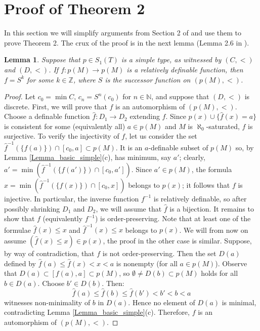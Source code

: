 \documentclass[12pt]{amsart}
\newtheorem{Lemma}[Theorem]{Lemma}
\theoremstyle{definition}
\begin{document}
 


\section{Proof of Theorem 2}


In this section we will simplify arguments from Section 2 of \cite{DI} and use them to prove Theorem 2. The crux of the proof is in the next lemma (Lemma 2.6 in \cite{DI}). 


\begin{Lemma}\label{Lemma_f_is_Sn}
Suppose that  $p\in S_1(T)$ is a simple type, as witnessed by $(C,<)$ and $(D,<)$.  If $f:p(M)\to p(M)$ is a relatively definable function, then $f=S^k$ for some $k\in\mathbb Z$, where $S$ is the successor function on $(p(M),<)$.
\end{Lemma}
\begin{proof}Let $c_0=\min C$, $c_n=S^n(c_0)$ for $n\in\mathbb N$, and  suppose that $(D,<)$ is discrete.   
First, we will prove that $f$ is an automorphism of $(p(M),<)$. Choose a definable function $\hat f:D_1\to D_2$ extending $f$. Since $p(x)\cup\{\hat f(x)=a\}$ is consistent for some (equivalently all) $a\in p(M)$ and $M$ is $\aleph_0$-saturated, $f$ is surjective.
To verify the injectivity of $f$, let us consider the set $\hat f^{-1}(\{f(a)\})\cap [c_0,a]\subset p(M)$. It is an $a$-definable subset of $p(M)$ so, by Lemma \ref{Lemma_basic_simple}(c), has minimum, say $a'$; clearly,   $a'=\min(\hat f^{-1}(\{f(a')\})\cap [c_0,a'])$. Since  $a'\in p(M)$, the formula  $x=\min(\hat f^{-1}(\{f(x)\})\cap [c_0,x])$ belongs to $p(x)$; it follows that $f$ is injective. 
In particular, the inverse function $f^{-1}$ is relatively definable, so after possibly shrinking $D_1$ and $D_2$, we will assume that $\hat f$ is a bijection.
It remains to show that $f$ (equivalently $f^{-1}$) is order-preserving. 
Note that at least one of the formulae $\hat f(x)\leq x$ and $\hat f^{-1}(x)\leq x$ belongs to $p(x)$. We will from now on assume $(\hat f(x)\leq x)\in p(x)$, the proof in the other case is similar.
Suppose, by way of contradiction, that $f$ is not order-preserving. Then the set $D(a)$ defined by $\hat f(a)\leq \hat f(x)<x<a$ is nonempty (for all $a\in p(M)$). Observe that  $D(a)\subset [f(a),a]\subset p(M)$,  so  $\emptyset\neq D(b)\subset p(M)$ holds for all $b\in D(a)$. Choose $b'\in D(b)$. Then:  
$$\hat f(a)\leq \hat f(b)\leq \hat f(b')<b'<b<a$$ witnesses non-minimality of $b$ in $D(a)$. Hence no element of $D(a)$ is minimal, contradicting Lemma \ref{Lemma_basic_simple}(c). Therefore, $f$ is an automorphism of $(p(M),<)$. 


\end{proof}
\end{document}
